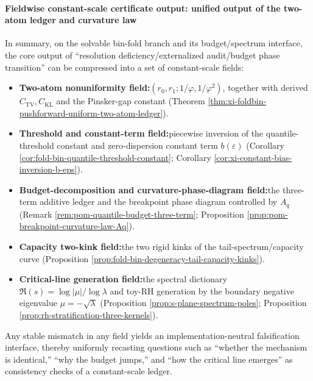 \paragraph{Fieldwise constant-scale certificate output: unified output of the two-atom ledger and curvature law}
In summary, on the solvable bin-fold branch and its budget/spectrum interface, the core output of ``resolution deficiency/externalized audit/budget phase transition'' can be compressed into a set of constant-scale fields:
\begin{itemize}
  \item \textbf{Two-atom nonuniformity field:}\((r_0,r_1;1/\varphi,1/\varphi^2)\), together with derived \(C_{\mathrm{TV}},C_{\mathrm{KL}}\) and the Pinsker-gap constant (Theorem \ref{thm:xi-foldbin-pushforward-uniform-two-atom-ledger}).
  \item \textbf{Threshold and constant-term field:}piecewise inversion of the quantile-threshold constant and zero-dispersion constant term \(b(\varepsilon)\) (Corollary \ref{cor:fold-bin-quantile-threshold-constant}; Corollary \ref{cor:xi-constant-bias-inversion-b-eps}).
  \item \textbf{Budget-decomposition and curvature-phase-diagram field:}the three-term additive ledger and the breakpoint phase diagram controlled by \(A_q\) (Remark \ref{rem:pom-quantile-budget-three-term}; Proposition \ref{prop:pom-breakpoint-curvature-law-Aq}).
  \item \textbf{Capacity two-kink field:}the two rigid kinks of the tail-spectrum/capacity curve (Proposition \ref{prop:fold-bin-degeneracy-tail-capacity-kinks}).
  \item \textbf{Critical-line generation field:}the spectral dictionary \(\Re(s)=\log|\mu|/\log\lambda\) and toy-RH generation by the boundary negative eigenvalue \(\mu=-\sqrt\lambda\) (Proposition \ref{prop:s-plane-spectrum-poles}; Proposition \ref{prop:rh-stratification-three-kernels}).
\end{itemize}
Any stable mismatch in any field yields an implementation-neutral falsification interface, thereby uniformly recasting questions such as ``whether the mechanism is identical,'' ``why the budget jumps,'' and ``how the critical line emerges'' as consistency checks of a constant-scale ledger.


